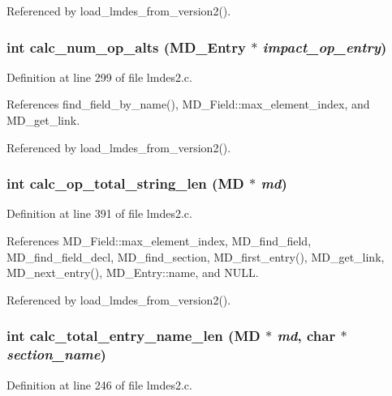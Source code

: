 Referenced by load\_\-lmdes\_\-from\_\-version2().
\subsubsection{\setlength{\rightskip}{0pt plus 5cm}int calc\_\-num\_\-op\_\-alts (\bf{MD\_\-Entry} $\ast$ {\em impact\_\-op\_\-entry})}\label{lmdes2_8c_e51936eb893fc5d7cc61f2dea3c4cd9c}




Definition at line 299 of file lmdes2.c.

References find\_\-field\_\-by\_\-name(), MD\_\-Field::max\_\-element\_\-index, and MD\_\-get\_\-link.

Referenced by load\_\-lmdes\_\-from\_\-version2().
\subsubsection{\setlength{\rightskip}{0pt plus 5cm}int calc\_\-op\_\-total\_\-string\_\-len (\bf{MD} $\ast$ {\em md})}\label{lmdes2_8c_7967aafc33685b5b6a38c9d7f3fe2bf9}




Definition at line 391 of file lmdes2.c.

References MD\_\-Field::max\_\-element\_\-index, MD\_\-find\_\-field, MD\_\-find\_\-field\_\-decl, MD\_\-find\_\-section, MD\_\-first\_\-entry(), MD\_\-get\_\-link, MD\_\-next\_\-entry(), MD\_\-Entry::name, and NULL.

Referenced by load\_\-lmdes\_\-from\_\-version2().
\subsubsection{\setlength{\rightskip}{0pt plus 5cm}int calc\_\-total\_\-entry\_\-name\_\-len (\bf{MD} $\ast$ {\em md}, char $\ast$ {\em section\_\-name})}\label{lmdes2_8c_3643591e6f1acf88563df0bf51208342}




Definition at line 246 of file lmdes2.c.

